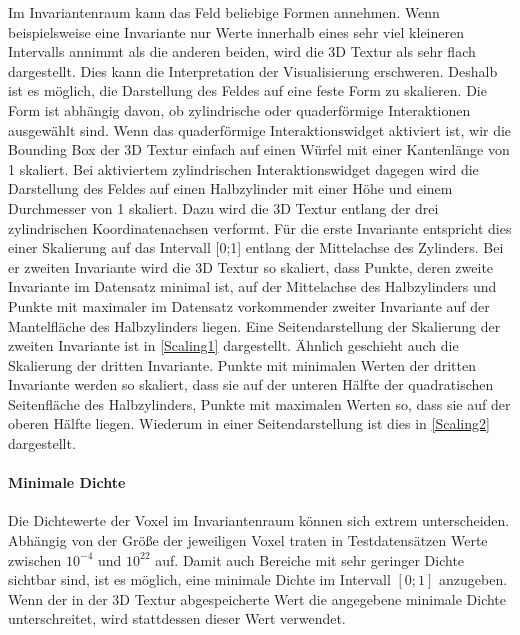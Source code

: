 \documentclass[a4paper,fontsize=12pt,toc=bib,parskip=half,ngerman]{scrartcl}
\begin{document}
Im Invariantenraum kann das Feld beliebige Formen annehmen. Wenn beispielsweise eine Invariante nur Werte innerhalb eines sehr viel kleineren Intervalls annimmt als die anderen beiden, wird die 3D Textur als sehr flach dargestellt. Dies kann die Interpretation der Visualisierung erschweren. Deshalb ist es m\"oglich, die Darstellung des Feldes auf eine feste Form zu skalieren. Die Form ist abh\"angig davon, ob zylindrische oder quaderf\"ormige Interaktionen ausgew\"ahlt sind. Wenn das quaderf\"ormige Interaktionswidget aktiviert ist, wir die Bounding Box der 3D Textur einfach auf einen W\"urfel mit einer Kantenl\"ange von 1 skaliert. Bei aktiviertem zylindrischen Interaktionswidget dagegen wird die Darstellung des Feldes auf einen Halbzylinder mit einer H\"ohe und einem Durchmesser von 1 skaliert. Dazu wird die 3D Textur entlang der drei zylindrischen Koordinatenachsen verformt. F\"ur die erste Invariante entspricht dies einer Skalierung auf das Intervall [0;1] entlang der Mittelachse des Zylinders. Bei er zweiten Invariante wird die 3D Textur so skaliert, dass Punkte, deren zweite Invariante im Datensatz minimal ist, auf der Mittelachse des Halbzylinders und Punkte mit maximaler im Datensatz vorkommender zweiter Invariante auf der Mantelfl\"ache des Halbzylinders liegen. Eine Seitendarstellung der Skalierung der zweiten Invariante ist in \cref{Scaling1} dargestellt. \"Ahnlich geschieht auch die Skalierung der dritten Invariante. Punkte mit minimalen Werten der dritten Invariante werden so skaliert, dass sie auf der unteren H\"alfte der quadratischen Seitenfl\"ache des Halbzylinders, Punkte mit maximalen Werten so, dass sie auf der oberen H\"alfte liegen. Wiederum in einer Seitendarstellung ist dies in \cref{Scaling2} dargestellt.

\paragraph{Minimale Dichte}
Die Dichtewerte der Voxel im Invariantenraum k\"onnen sich extrem unterscheiden. Abh\"angig von der Gr\"o{\ss}e der jeweiligen Voxel traten in Testdatens\"atzen Werte zwischen $10^{-4}$ und $10^22$ auf. Damit auch Bereiche mit sehr geringer Dichte sichtbar sind, ist es m\"oglich, eine minimale Dichte im Intervall $[0;1]$ anzugeben. Wenn der in der 3D Textur abgespeicherte Wert die angegebene minimale Dichte unterschreitet, wird stattdessen dieser Wert verwendet.
\end{document}

